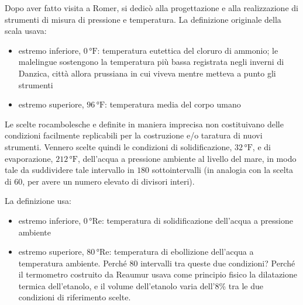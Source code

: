 \documentclass[letterpaper,10pt,italian]{jupyterBook}
\begin{document}
\sphinxAtStartPar
{} Dopo aver fatto visita a Romer, si dedicò alla progettazione e alla realizzazione di strumenti di misura di pressione e temperatura. La definizione originale della scala usava:
\begin{itemize}
\item {} 
\sphinxAtStartPar
estremo inferiore,   \(0 \, \text{°F}\): temperatura eutettica del cloruro di ammonio; le malelingue sostengono la temperatura più bassa registrata negli inverni di Danzica, città allora prussiana in cui viveva mentre metteva a punto gli strumenti

\item {} 
\sphinxAtStartPar
estremo superiore,   \(96 \, \text{°F}\): temperatura media del corpo umano

\end{itemize}

\sphinxAtStartPar
Le scelte rocambolesche e definite in maniera imprecisa non costituivano delle condizioni facilmente replicabili per la costruzione e/o taratura di nuovi strumenti. Vennero scelte quindi le condizioni di solidificazione, \(32 \, \text{°F}\), e di evaporazione, \(212 \, \text{°F}\), dell’acqua a pressione ambiente al livello del mare, in modo tale da suddividere tale intervallo in \(180\) sotto\sphinxhyphen{}intervalli (in analogia con la scelta di \(60\), per avere un numero elevato di divisori interi).

\sphinxAtStartPar
{} La definizione usa:
\begin{itemize}
\item {} 
\sphinxAtStartPar
estremo inferiore, \(0 \, \text{°Re}\): temperatura di solidificazione dell’acqua a pressione ambiente

\item {} 
\sphinxAtStartPar
estremo superiore, \(80 \, \text{°Re}\): temperatura di ebollizione dell’acqua a temperatura ambiente. Perché 80 intervalli tra queste due condizioni? Perché il termometro costruito da Reaumur usava come principio fisico la dilatazione termica dell’etanolo, e il volume dell’etanolo varia dell’8\% tra le due condizioni di riferimento scelte.

\end{itemize}
\end{document}
